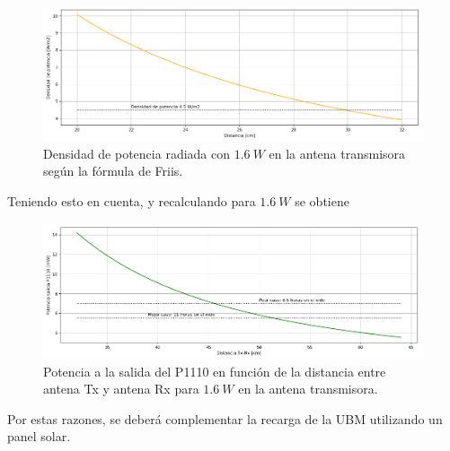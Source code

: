 \begin{figure}[H]
	\centering
	\includegraphics[width=\linewidth]{ImagenesFactibilidad/densidadradiada}
	\caption{Densidad de potencia radiada con $1.6 \ W$ en la antena transmisora según la fórmula de Friis.}
	\label{fig:densidadradiada}
\end{figure}

Teniendo esto en cuenta, y recalculando para $1.6 \ W$ se obtiene

\begin{figure}[H]
	\centering
	\includegraphics[width=\linewidth]{ImagenesFactibilidad/recalculo}
	\caption{Potencia a la salida del P1110 en función de la distancia entre antena Tx y antena Rx para $1.6 \ W$ en la antena transmisora.}
	\label{fig:recalculo}
\end{figure}

Por estas razones, se deberá complementar la recarga de la UBM utilizando un panel solar.
